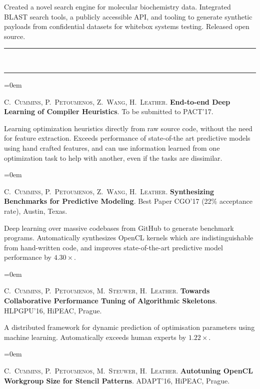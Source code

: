 \documentclass[a4paper,11pt,hidelinks]{scrartcl}
\newcommand{\MarginText}[1]{\marginpar{\raggedleft\itshape\normalsize#1}}
\newcommand{\Title}[1]{\noindent\rule{15cm}{0.4pt}\vspace{-.45em}\\
\noindent\spacedlowsmallcaps{\color{titlecolour}{#1}}

\vspace{-.85em}\noindent\rule{15cm}{0.4pt}\vspace{.2em}}
\newcommand{\Description}[1]{\hangindent=0em\hangafter=0%
\noindent\normalsize{#1}\vspace{1em}}
\newcommand{\Publication}[5]{\Description{\MarginText{#1}#2. \textbf{\href{#5}{#3}}. #4.}}
\begin{document}
\begin{cv}
{  \noindent %
  Created a novel search engine for molecular biochemistry data. Integrated BLAST search tools, a publicly accessible API, and tooling to generate synthetic payloads from confidential datasets for whitebox systems testing. Released open source.%
}

\Title{Publications}

\Description{\MarginText{\textit{(in preparation)}}C.\ \textsc{Cummins}, P.\
  \textsc{Petoumenos}, Z.\ \textsc{Wang}, H.\
  \textsc{Leather}. \textbf{End-to-end Deep Learning of Compiler Heuristics}. To be submitted to PACT'17.\@
  \newline\vspace{-.8em}

  \noindent %
  Learning optimization heuristics directly from raw source code, without the need for feature extraction. Exceeds performance of state-of-the art predictive models using hand crafted features, and can use information learned from one optimization task to help with another, even if the tasks are dissimilar.%
}

\Description{\MarginText{2017}C.\ \textsc{Cummins}, P.\
  \textsc{Petoumenos}, Z.\ \textsc{Wang}, H.\
  \textsc{Leather}. \textbf{Synthesizing Benchmarks for Predictive Modeling}. Best Paper CGO'17 (22\% acceptance rate), Austin, Texas.\@
  \newline\vspace{-.8em}

  \noindent %
  Deep learning over massive codebases from GitHub to generate benchmark programs. Automatically synthesizes OpenCL kernels which are indistinguishable from hand-written code, and improves state-of-the-art predictive model performance by $4.30\times$.%
}

\Description{\MarginText{2016}C.\ \textsc{Cummins}, P.\
  \textsc{Petoumenos}, M.\ \textsc{Steuwer}, H.\
  \textsc{Leather}. \textbf{Towards Collaborative Performance Tuning
    of Algorithmic Skeletons}. HLPGPU'16, HiPEAC, Prague.\@
  \newline\vspace{-.8em}

  \noindent %
  A distributed framework for dynamic prediction of optimisation parameters using machine learning. Automatically exceeds human experts by $1.22\times$.%
}

\Description{\MarginText{2016}C.\ \textsc{Cummins}, P.\
  \textsc{Petoumenos}, M.\ \textsc{Steuwer}, H.\
  \textsc{Leather}. \textbf{Autotuning OpenCL Workgroup Size for
    Stencil Patterns}. ADAPT'16, HiPEAC, Prague.\@ \newline\vspace{-.8em}

}
\end{cv}
\end{document}

